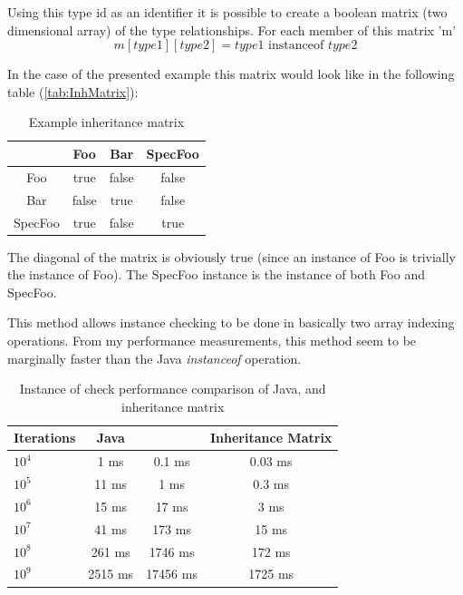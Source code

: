 Using this type id as an identifier it is possible to create a boolean matrix
(two dimensional array) of the type relationships. For each member of this matrix
'm' 
\[
m[type1][type2] = type1\textrm{ instanceof }type2
\]

In the case of the presented example this matrix would look like in the
following table (\ref{tab:InhMatrix}):

\begin{table}[ht]
	\footnotesize
	\centering
	\caption{Example inheritance matrix}\label{tab:InhMatrix}
	\begin{tabular}{| c | c | c | c |}
	\hline
			& Foo	& Bar	& SpecFoo	\\ \hline
	Foo		& true	& false	& false		\\ \hline
	Bar		& false	& true	& false		\\ \hline
	SpecFoo	& true	& false	& true		\\ \hline
	
	\hline
	\end{tabular}
	\label{tab:TabularExample}
\end{table}

The diagonal of the matrix is obviously true (since an instance of Foo is
trivially the instance of Foo). The SpecFoo instance is the instance of both Foo
and SpecFoo.

This method allows instance checking to be done in basically two array indexing
operations. From my performance measurements, this method seem to be marginally
faster than the Java \emph{instanceof} operation.

\begin{table}[ht]
	\footnotesize
	\centering
	\caption{Instance of check performance comparison of Java,
	\CPP{} and inheritance matrix}\label{tab:InstPerf}
	\begin{tabular}{ | l | c | c | c |}
	\hline
	Iterations 	& Java 		& \CPP{}	&	Inheritance Matrix	\\ \hline
	$10^4$ 		&  1	ms 	& 0.1	ms	&	0.03	ms			\\
	$10^5$ 		&  11 	ms  & 1		ms	&	0.3		ms			\\
	$10^6$ 		&  15 	ms  & 17	ms	&	3		ms			\\
	$10^7$ 		&  41 	ms  & 173	ms	&	15		ms			\\
	$10^8$ 		&  261 	ms  & 1746	ms	&	172		ms			\\
	$10^9$ 		&  2515 ms  & 17456	ms	&	1725	ms			\\
	\hline
	\end{tabular}
	\label{tab:TabularExample}
\end{table}


